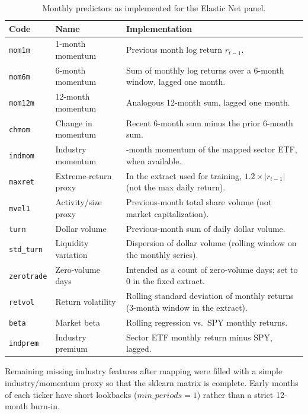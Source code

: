 \documentclass[11pt,twocolumn]{article}
\begin{document}
\begin{table}[t]
\centering
\caption{Monthly predictors as implemented for the Elastic Net panel.}
\label{table:feature_definitions}
\begin{tabularx}{\textwidth}{l l >{\RaggedRight}X}
\toprule
\textbf{Code} & \textbf{Name} & \textbf{Implementation} \\
\midrule
\texttt{mom1m} & 1-month momentum & Previous month log return $r_{t-1}$. \\
\texttt{mom6m} & 6-month momentum & Sum of monthly log returns over a 6-month window, lagged one month. \\
\texttt{mom12m} & 12-month momentum & Analogous 12-month sum, lagged one month. \\
\texttt{chmom} & Change in momentum & Recent 6-month sum minus the prior 6-month sum. \\
\texttt{indmom} & Industry momentum & 6-month momentum of the mapped sector ETF, when available. \\
\texttt{maxret} & Extreme-return proxy & In the extract used for training, $1.2\times|r_{t-1}|$ (not the max daily return). \\
\texttt{mvel1} & Activity/size proxy & Previous-month total share volume (not market capitalization). \\
\texttt{turn} & Dollar volume & Previous-month sum of daily dollar volume. \\
\texttt{std\_turn} & Liquidity variation & Dispersion of dollar volume (rolling window on the monthly series). \\
\texttt{zerotrade} & Zero-volume days & Intended as a count of zero-volume days; set to 0 in the fixed extract. \\
\texttt{retvol} & Return volatility & Rolling standard deviation of monthly returns (3-month window in the extract). \\
\texttt{beta} & Market beta & Rolling regression vs.\ SPY monthly returns. \\
\texttt{indprem} & Industry premium & Sector ETF monthly return minus SPY, lagged. \\
\bottomrule
\end{tabularx}
\end{table}

Remaining missing industry features after mapping were filled with a simple industry/momentum proxy so that the sklearn matrix is complete. Early months of each ticker have short lookbacks ($min\_periods=1$) rather than a strict 12-month burn-in.
\end{document}
